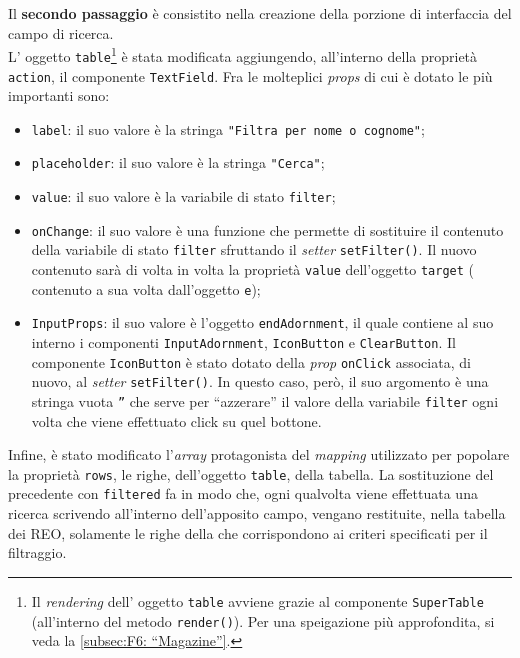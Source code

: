 Il \textbf{secondo passaggio} è consistito nella creazione della porzione di interfaccia del campo di ricerca.\\
L' oggetto \texttt{table}\footnote{Il \textit{rendering} dell' oggetto \texttt{table} avviene grazie al componente \texttt{SuperTable} (all'interno del metodo \texttt{render()}). Per una speigazione più approfondita, si veda la \autoref{subsec:F6: “Magazine”}.} è stata modificata aggiungendo, all'interno della proprietà \texttt{action}, il componente \texttt{TextField}. Fra le molteplici \textit{props} di cui è dotato le più importanti sono:
\begin{itemize}
    \item \texttt{label}: il suo valore è la stringa \texttt{"Filtra per nome o cognome"};
    
    \item \texttt{placeholder}: il suo valore è la stringa \texttt{"Cerca"};
    
    \item \texttt{value}: il suo valore è la variabile di stato \texttt{filter};
    
    \item \texttt{onChange}: il suo valore è una funzione che permette di sostituire il contenuto della variabile di stato \texttt{filter} sfruttando il \textit{setter} \texttt{setFilter()}. Il nuovo contenuto sarà di volta in volta la proprietà \texttt{value} dell'oggetto \texttt{target} ( contenuto a sua volta dall'oggetto \texttt{e});
    
    \item \texttt{InputProps}: il suo valore è l'oggetto \texttt{endAdornment}, il quale contiene al suo interno i componenti \texttt{InputAdornment}, \texttt{IconButton} e \texttt{ClearButton}. Il componente \texttt{IconButton} è stato dotato della \textit{prop} \texttt{onClick} associata, di nuovo, al \textit{setter} \texttt{setFilter()}. In questo caso, però, il suo argomento è una stringa vuota \texttt{''} che serve per “azzerare” il valore della variabile \texttt{filter} ogni volta che viene effettuato click su quel bottone.
\end{itemize}

Infine, è stato modificato l'\textit{array} protagonista del \textit{mapping} utilizzato per popolare la proprietà \texttt{rows}, le righe, dell'oggetto \texttt{table}, della tabella.
La sostituzione del precedente con \texttt{filtered} fa in modo che, ogni qualvolta viene effettuata una ricerca scrivendo all'interno dell'apposito campo, vengano restituite, nella tabella dei REO, solamente le righe della  che corrispondono ai criteri specificati per il filtraggio.

